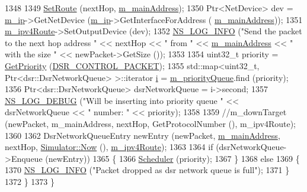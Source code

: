 \begin{DoxyCode}
1348 
1349       \hyperlink{classns3_1_1dsr_1_1DsrRouting_a8a726fb52558a1a8172a5bd5b8cdb072}{SetRoute} (nextHop, \hyperlink{classns3_1_1dsr_1_1DsrRouting_a73182b5edee2d8460f28855e058fc9a0}{m\_mainAddress});
1350       Ptr<NetDevice> dev = \hyperlink{classns3_1_1dsr_1_1DsrRouting_a0443d48172143cafa1d0491e35f3fbaf}{m\_ip}->GetNetDevice (\hyperlink{classns3_1_1dsr_1_1DsrRouting_a0443d48172143cafa1d0491e35f3fbaf}{m\_ip}->GetInterfaceForAddress (
      \hyperlink{classns3_1_1dsr_1_1DsrRouting_a73182b5edee2d8460f28855e058fc9a0}{m\_mainAddress}));
1351       \hyperlink{classns3_1_1dsr_1_1DsrRouting_ab4c16d56044159989e52ad33c0afed2b}{m\_ipv4Route}->SetOutputDevice (dev);
1352       \hyperlink{group__logging_gafbd73ee2cf9f26b319f49086d8e860fb}{NS\_LOG\_INFO} (\textcolor{stringliteral}{"Send the packet to the next hop address "} << nextHop << \textcolor{stringliteral}{" from "} << 
      \hyperlink{classns3_1_1dsr_1_1DsrRouting_a73182b5edee2d8460f28855e058fc9a0}{m\_mainAddress} << \textcolor{stringliteral}{" with the size "} << newPacket->GetSize ());
1353 
1354       uint32\_t priority = \hyperlink{classns3_1_1dsr_1_1DsrRouting_a67d111b0188b6e2210d1b4782820f8e3}{GetPriority} (\hyperlink{namespacens3_1_1dsr_a7c80bcec67d78dc149a0e503014d07c5abeaa53bf31d961c221e4e377ef6022f2}{DSR\_CONTROL\_PACKET});
1355       std::map<uint32\_t, Ptr<dsr::DsrNetworkQueue> >::iterator \hyperlink{bernuolliDistribution_8m_a6f6ccfcf58b31cb6412107d9d5281426}{i} = 
      \hyperlink{classns3_1_1dsr_1_1DsrRouting_a4606c3dfb1099afbfe1e7cd1d1c3c8ee}{m\_priorityQueue}.find (priority);
1356       Ptr<dsr::DsrNetworkQueue> dsrNetworkQueue = i->second;
1357       \hyperlink{group__logging_ga413f1886406d49f59a6a0a89b77b4d0a}{NS\_LOG\_DEBUG} (\textcolor{stringliteral}{"Will be inserting into priority queue "} << dsrNetworkQueue << \textcolor{stringliteral}{" number: "} 
      << priority);
1358 
1359       \textcolor{comment}{//m\_downTarget (newPacket, m\_mainAddress, nextHop, GetProtocolNumber (), m\_ipv4Route);}
1360 
1362      DsrNetworkQueueEntry newEntry (newPacket, \hyperlink{classns3_1_1dsr_1_1DsrRouting_a73182b5edee2d8460f28855e058fc9a0}{m\_mainAddress}, nextHop, 
      \hyperlink{classns3_1_1Simulator_ac3178fa975b419f7875e7105be122800}{Simulator::Now} (), \hyperlink{classns3_1_1dsr_1_1DsrRouting_ab4c16d56044159989e52ad33c0afed2b}{m\_ipv4Route});
1363 
1364      \textcolor{keywordflow}{if} (dsrNetworkQueue->Enqueue (newEntry))
1365        \{
1366          \hyperlink{classns3_1_1dsr_1_1DsrRouting_aa518edb174bccce1062304404424c6e0}{Scheduler} (priority);
1367        \}
1368      \textcolor{keywordflow}{else}
1369        \{
1370          \hyperlink{group__logging_gafbd73ee2cf9f26b319f49086d8e860fb}{NS\_LOG\_INFO} (\textcolor{stringliteral}{"Packet dropped as dsr network queue is full"});
1371        \}
1372     \}
1373 \}
\end{DoxyCode}



